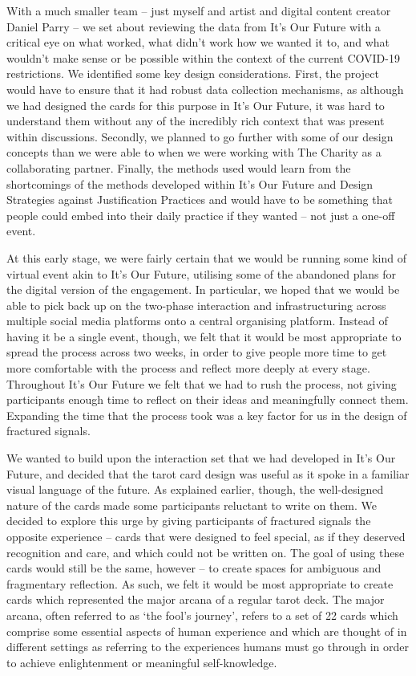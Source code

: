 With a much smaller team – just myself and artist and digital content creator Daniel Parry – we set about reviewing the data from It’s Our Future with a critical eye on what worked, what didn’t work how we wanted it to, and what wouldn’t make sense or be possible within the context of the current COVID-19 restrictions.  We identified some key design considerations. First, the project would have to ensure that it had robust data collection mechanisms, as although we had designed the cards for this purpose in It’s Our Future, it was hard to understand them without any of the incredibly rich context that was present within discussions. Secondly, we planned to go further with some of our design concepts than we were able to when we were working with The Charity as a collaborating partner. Finally, the methods used would learn from the shortcomings of the methods developed within It’s Our Future and Design Strategies against Justification Practices and would have to be something that people could embed into their daily practice if they wanted – not just a one-off event. 

At this early stage, we were fairly certain that we would be running some kind of virtual event akin to It’s Our Future, utilising some of the abandoned plans for the digital version of the engagement. In particular, we hoped that we would be able to pick back up on the two-phase interaction and infrastructuring across multiple social media platforms onto a central organising platform. Instead of having it be a single event, though, we felt that it would be most appropriate to spread the process across two weeks, in order to give people more time to get more comfortable with the process and reflect more deeply at every stage. Throughout It’s Our Future we felt that we had to rush the process, not giving participants enough time to reflect on their ideas and meaningfully connect them. Expanding the time that the process took was a key factor for us in the design of fractured signals. 

We wanted to build upon the interaction set that we had developed in It’s Our Future, and decided that the tarot card design was useful as it spoke in a familiar visual language of the future. As explained earlier, though, the well-designed nature of the cards made some participants reluctant to write on them. We decided to explore this urge by giving participants of fractured signals the opposite experience – cards that were designed to feel special, as if they deserved recognition and care, and which could not be written on. The goal of using these cards would still be the same, however – to create spaces for ambiguous and fragmentary reflection. As such, we felt it would be most appropriate to create cards which represented the major arcana of a regular tarot deck. The major arcana, often referred to as ‘the fool’s journey’, refers to a set of 22 cards which comprise some essential aspects of human experience and which are thought of in different settings as referring to the experiences humans must go through in order to achieve enlightenment or meaningful self-knowledge. 

